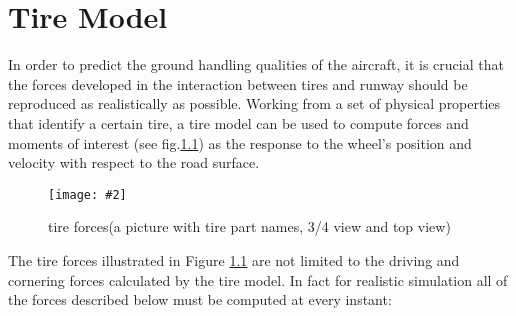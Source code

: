 \documentclass[12pt,a4paper]{report}
\newcommand{\figura}[5][htbp]{
\begin{figure}[#1]
\begin{center}
\texttt{[image: \#2]}
\caption{#4}\label{#5}
\end{center}
\end{figure}
}
\begin{document}
\chapter{Tire Model} \label{tireintro}
In order to predict the ground handling qualities of the aircraft, it is crucial that the forces developed in the interaction between tires and runway should be reproduced as realistically as possible.
Working from a set of physical properties that identify a certain tire, a tire model can be used to compute forces and moments of interest (see fig.\ref{fig:tireforces:intro}) as the response to the wheel's position and velocity with respect to the road surface.
\figura{piczero.jpg}{}{tire forces(a picture with tire part names, 3/4 view and top view) }{fig:tireforces:intro}

The tire forces illustrated in Figure \ref{fig:tireforces:intro} are not limited to the driving and cornering forces calculated by the tire model. In fact for realistic simulation all of the forces described below must be computed at every instant:
\end{document}
